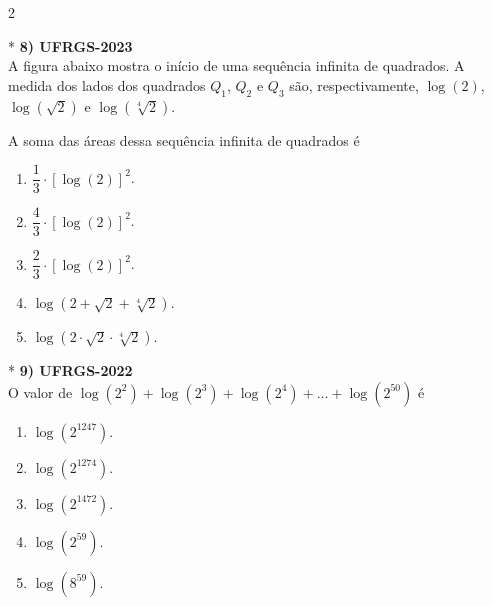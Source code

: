 \documentclass[11pt,a4paper]{article}
\begin{document}
\begin{paracol}{2}
\switchcolumn[1]
\vspace{7cm}

\switchcolumn[0]*
\textbf{8) UFRGS-2023} \\
A figura abaixo mostra o início de uma sequência infinita de quadrados. A medida dos lados dos quadrados $Q_1$, $Q_2$ e $Q_3$ são, respectivamente, $\log(2)$, $\log(\sqrt{2})$ e $\log(\sqrt[4]{2})$.

\begin{center}
\end{center}

A soma das áreas dessa sequência infinita de quadrados é

\begin{enumerate}[label=(\Alph*), itemsep=0.2cm]
    \item $\dfrac{1}{3} \cdot [\log(2)]^2$.
    \item $\dfrac{4}{3} \cdot [\log(2)]^2$.
    \item $\dfrac{2}{3} \cdot [\log(2)]^2$.
    \item $\log(2 + \sqrt{2} + \sqrt[4]{2})$.
    \item $\log(2 \cdot \sqrt{2} \cdot \sqrt[4]{2})$.
\end{enumerate}
\vspace{0.4cm}

\switchcolumn[1]
\vspace{9.5cm}

\switchcolumn[0]*
\textbf{9) UFRGS-2022} \\
O valor de $\log(2^2) + \log(2^3) + \log(2^4) + \dots + \log(2^{50})$ é

\begin{enumerate}[label=(\Alph*), itemsep=0.2cm]
    \item $\log(2^{1247})$.
    \item $\log(2^{1274})$.
    \item $\log(2^{1472})$.
    \item $\log(2^{59})$.
    \item $\log(8^{59})$.
\end{enumerate}
\vspace{0.4cm}


\end{paracol}
\end{document}
